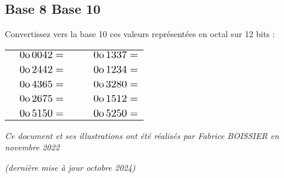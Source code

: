 \documentclass[11pt,a4paper]{article}
\begin{document}
\bigskip


\subsection{Base 8 \textrightarrow{} Base 10}

\smallskip

Convertissez vers la base 10 ces valeurs représentées en octal sur 12 bits :

\bigskip

\begin{tabular}{ l l  C{4.5cm}  l l }
  & $ \Scale[1.25]{ 0\text{o} \, 0042 = } $   & &   & $ \Scale[1.25]{ 0\text{o} \, 1337 = } $ \\
 & & & & \\
  & $ \Scale[1.25]{ 0\text{o} \, 2442 = } $   & &   & $ \Scale[1.25]{ 0\text{o} \, 1234 = } $ \\
 & & & & \\
  & $ \Scale[1.25]{ 0\text{o} \, 4365 = } $   & &   & $ \Scale[1.25]{ 0\text{o} \, 3280 = } $ \\
 & & & & \\
  & $ \Scale[1.25]{ 0\text{o} \, 2675 = } $   & &   & $ \Scale[1.25]{ 0\text{o} \, 1512 = } $ \\
 & & & & \\
  & $ \Scale[1.25]{ 0\text{o} \, 5150 = } $   & &   & $ \Scale[1.25]{ 0\text{o} \, 5250 = } $ \\
\end{tabular}



\bigskip

\vfillFirst

\vfillLast

\begin{center}
\textit{Ce document et ses illustrations ont été réalisés par Fabrice BOISSIER en novembre 2022}

\textit{(dernière mise à jour octobre 2024)}
\end{center}
\end{document}
